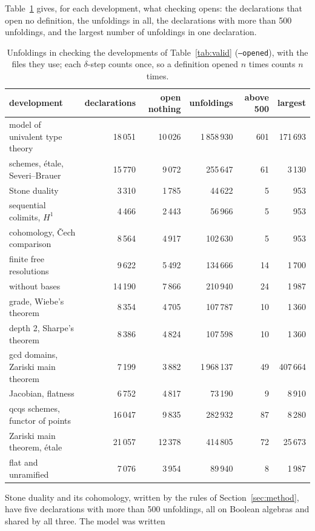\documentclass[11pt]{article}
\newcommand{\kw}[1]{\texttt{#1}}
\begin{document}
Table~\ref{tab:totals} gives, for each development, what checking
opens: the declarations that open no definition, the unfoldings in
all, the declarations with more than 500 unfoldings, and the largest
number of unfoldings in one declaration.
\begin{table}[ht]
\centering
\small
\setlength{\tabcolsep}{4pt}
\begin{tabular}{lrrrrr}
\toprule
development & declarations & open nothing & unfoldings & above 500 & largest\\
\midrule
model of univalent type theory & 18\,051 & 10\,026 & 1\,858\,930 & 601 & 171\,693\\
schemes, \'etale, Severi--Brauer & 15\,770 & 9\,072 & 255\,647 & 61 & 3\,130\\
Stone duality & 3\,310 & 1\,785 & 44\,622 & 5 & 953\\
sequential colimits, $H^1$ & 4\,466 & 2\,443 & 56\,966 & 5 & 953\\
cohomology, \v{C}ech comparison & 8\,564 & 4\,917 & 102\,630 & 5 & 953\\
finite free resolutions & 9\,622 & 5\,492 & 134\,666 & 14 & 1\,700\\
\quad without bases & 14\,190 & 7\,866 & 210\,940 & 24 & 1\,987\\
grade, Wiebe's theorem & 8\,354 & 4\,705 & 107\,787 & 10 & 1\,360\\
depth 2, Sharpe's theorem & 8\,386 & 4\,824 & 107\,598 & 10 & 1\,360\\
gcd domains, Zariski main theorem & 7\,199 & 3\,882 & 1\,968\,137 & 49 & 407\,664\\
Jacobian, flatness & 6\,752 & 4\,817 & 73\,190 & 9 & 8\,910\\
qcqs schemes, functor of points & 16\,047 & 9\,835 & 282\,932 & 87 & 8\,280\\
Zariski main theorem, \'etale & 21\,057 & 12\,378 & 414\,805 & 72 & 25\,673\\
flat and unramified & 7\,076 & 3\,954 & 89\,940 & 8 & 1\,987\\
\bottomrule
\end{tabular}
\caption{Unfoldings in checking the developments of
  Table~\ref{tab:valid} (\kw{--opened}), with the files they use;
  each $\delta$-step counts once, so a definition opened $n$ times
  counts $n$ times.}
\label{tab:totals}
\end{table}
Stone duality and its cohomology, written by the rules of
Section~\ref{sec:method}, have five declarations with more than 500
unfoldings, all on Boolean algebras and shared by all three. The model was written
\end{document}
